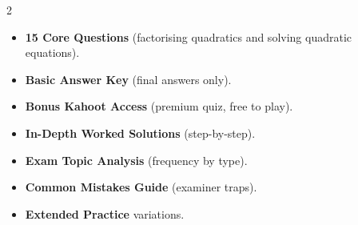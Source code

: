 \documentclass[11pt,a4paper]{article}
\newcommand{\FullReleaseDate}{April 30, 2026}
\begin{document}
\vspace{8pt}

\begin{multicols}{2}
  \begin{tcolorbox}[card, title=\sffamily\bfseries\textcolor{white}{\faHandPointDown\ TODAY (Simplified Version)}, colbacktitle=mainblue, boxed title style={sharp corners, boxrule=0pt}]
    \begin{itemize}[leftmargin=1.2em, itemsep=2pt]
      \item \small \textbf{15 Core Questions} (factorising quadratics and solving quadratic equations).
      \item \small \textbf{Basic Answer Key} (final answers only).
      \item \small \textbf{Bonus Kahoot Access} (premium quiz, free to play).
    \end{itemize}
  \end{tcolorbox}

  \columnbreak

  \begin{tcolorbox}[card, title=\sffamily\bfseries\textcolor{white}{\faRocket\ ON \FullReleaseDate\ (Full Upgrade)}, colbacktitle=mainblue, boxed title style={sharp corners, boxrule=0pt}]
    \begin{itemize}[leftmargin=1.2em, itemsep=2pt]
      \item \small \textbf{In-Depth Worked Solutions} (step-by-step).
      \item \small \textbf{Exam Topic Analysis} (frequency by type).
      \item \small \textbf{Common Mistakes Guide} (examiner traps).
      \item \small \textbf{Extended Practice} variations.
    \end{itemize}
  \end{tcolorbox}
\end{multicols}
\end{document}
